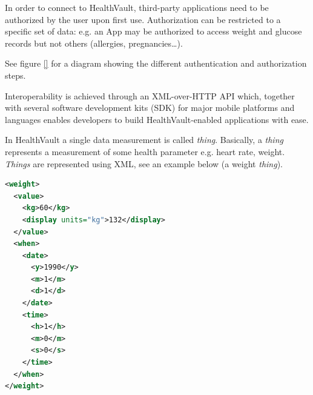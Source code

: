 In order to connect to HealthVault, third-party applications need to be authorized by the user
upon first use. Authorization can be restricted to a specific set of data: e.g. an App may be
authorized to access weight and glucose records but not others (allergies, pregnancies\ldots).

See figure \ref{} for a diagram showing the different authentication and authorization steps.

Interoperability is achieved through an XML-over-HTTP API which, together with several
software development kits (SDK) for major mobile platforms and languages enables developers
to build HealthVault-enabled applications with ease.




In HealthVault a single data measurement is called \textit{thing}.
Basically, a \textit{thing} represents a measurement of some health parameter
e.g. heart rate, weight.
\textit{Things} are represented using XML, see an example below (a weight \textit{thing}).

\begin{lstlisting}[language=XML]
<weight>
  <value>
    <kg>60</kg>
    <display units="kg">132</display>
  </value>
  <when>
    <date>
      <y>1990</y>
      <m>1</m>
      <d>1</d>
    </date>
    <time>
      <h>1</h>
      <m>0</m>
      <s>0</s>
    </time>
  </when>
</weight>
\end{lstlisting}


